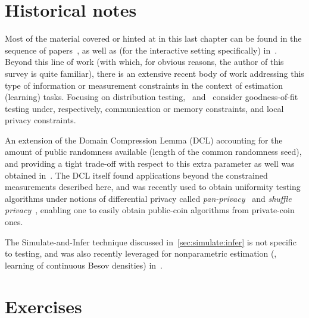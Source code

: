 \section{Historical notes}
  \label{sec:constrained:notes}
Most of the material covered or hinted at in this last chapter can be found in the sequence of papers~\citet{AcharyaCT:IT1,AcharyaCT19b,AcharyaCFST21}, as well as (for the interactive setting specifically) in~\citet{AcharyaCLST21,AcharyaCST20}. Beyond this line of work (with which, for obvious reasons, the author of this survey is quite familiar), there is an extensive recent body of work addressing this type of information or measurement constraints in the context of estimation (learning) tasks. Focusing on distribution testing,~\citet{DiakonikolasGKR19} and~\citet{AminJM20,BerrettB20} consider goodness-of-fit testing under, respectively, communication or memory constraints, and local privacy constraints.

An extension of the Domain Compression Lemma (DCL) accounting for the amount of public randomness available (length of the common randomness seed), and providing a tight trade-off with respect to this extra parameter as well was obtained in~\citet{AcharyaCHST20}. The DCL itself found applications beyond the constrained measurements described here, and was recently used to obtain uniformity testing algorithms under notions of differential privacy called \emph{pan-privacy}~\citep{AminJM20} and \emph{shuffle privacy}~\citep{BalcerCJM21,CL:22}, enabling one to easily obtain public-coin algorithms from private-coin ones.

The Simulate-and-Infer technique discussed in~\cref{sec:simulate:infer} is not specific to testing, and was also recently leveraged for nonparametric estimation (\ie, learning of continuous Besov densities) in~\citet{ACST:21b}.
\section{Exercises}

